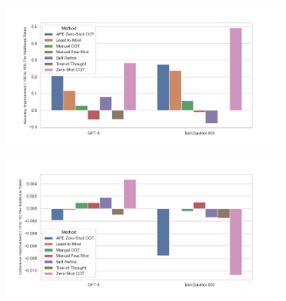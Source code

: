 \documentclass{beamer}
\begin{document}
\begin{frame}
\begin{figure}[h]
            \begin{subfigure}[h]{0.4925\textwidth}
                \centering
                \includegraphics[width=1.1\hsize]{../Output/gsm8k_change_in_accuracy_quality_per_change_in_conversation_length.png} 
            \end{subfigure}
            \hfill
            \begin{subfigure}[h]{0.4925\textwidth}
                \centering
                \includegraphics[width=1.1\hsize]{../Output/cw_change_in_accuracy_quality_per_change_in_conversation_length.png}
            \end{subfigure}

        \end{figure}

    \end{frame}
\end{document}
